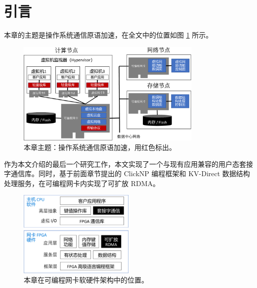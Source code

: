 \section{引言}
\label{socksdirect:sec:intro}

本章的主题是操作系统通信原语加速，在全文中的位置如图 \ref{socksdirect:fig:sys-arch} 所示。

\begin{figure}[htbp]
	\centering
	\includegraphics[width=0.8\textwidth]{images/sys_arch.pdf}
	\caption{本章主题：操作系统通信原语加速，用红色标出。}
	\label{socksdirect:fig:sys-arch}
\end{figure}

作为本文介绍的最后一个研究工作，本文实现了一个与现有应用兼容的用户态套接字通信库。同时，基于前面章节提出的 ClickNP 编程框架和 KV-Direct 数据结构处理服务，在可编程网卡内实现了可扩放 RDMA。

\begin{figure}[htbp]
	\centering
	\includegraphics[width=0.5\textwidth]{images/sw_hw_codesign.pdf}
	\caption{本章在可编程网卡软硬件架构中的位置。}
	\label{socksdirect:fig:sw-hw-codesign}
\end{figure}


